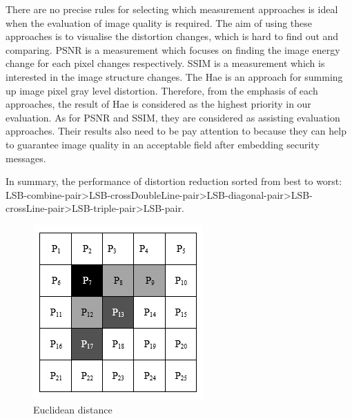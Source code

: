 There are no precise rules for selecting which measurement approaches is ideal when the evaluation of image quality is required. The aim of using these approaches is to visualise the distortion changes, which is hard to find out and comparing. PSNR is a measurement which focuses on finding the image energy change for each pixel changes respectively. SSIM is a measurement which is interested in the image structure changes. The Hae is an approach for summing up image pixel gray level distortion. Therefore, from the emphasis of each approaches, the result of Hae is considered as the highest priority in our evaluation. As for PSNR and SSIM, they are considered as assisting evaluation approaches. Their results also need to be pay attention to because they can help to guarantee image quality in an acceptable field after embedding security messages. 

In summary, the performance of distortion reduction sorted from best to worst: LSB-combine-pair>LSB-crossDoubleLine-pair>LSB-diagonal-pair>LSB-crossLine-pair>LSB-triple-pair>LSB-pair.


\begin{figure}[h]
\includegraphics[width=\columnwidth]{image/Euclidean_distance.PNG}
\caption{Euclidean distance}
\label{fig:figure}
\end{figure} 

